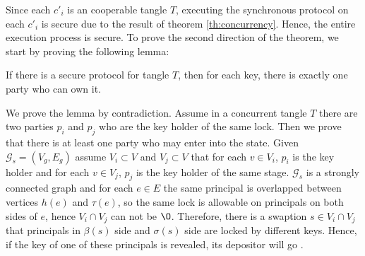Since each $c'_i$ is an cooperable tangle $T$, executing the synchronous protocol on each $c'_i$ is secure due to the result of theorem \ref{th:concurrency}. Hence, the entire execution process is secure.
To prove the second direction of the theorem, we start by proving the following lemma:
\begin{lemma}
\label{lm:multiple-key-holder}
If there is a secure protocol for tangle $T$, then for each key, there is exactly one party who can own it.
\end{lemma}


We prove the lemma by contradiction. Assume in a concurrent tangle $T$ there are two parties $p_i$ and $p_j$ who are the key holder of the same lock. Then we prove that there is at least one party who may enter into the \underwater state. Given $\mathcal{G}_s=(V_g, E_g)$ assume $V_i \subset V$ and $V_j \subset V$ that for each $v \in V_i$, $p_i$ is the key holder and for each $v \in V_j$, $p_j$ is the key holder of the same stage. $\mathcal{G}_s$ is a strongly connected graph and for each $e \in E$ the same principal is overlapped between vertices $h(e)$ and $\tau(e)$, so the same lock is allowable on principals on both sides of $e$, hence $V_i \cap V_j$ can not be $\O$. Therefore, there is a swaption $s \in V_i \cap V_j$ that principals in $\beta(s)$ side and $\sigma(s)$ side are locked by different keys. Hence, if the key of one of these principals is revealed, its depositor will go \underwater.



